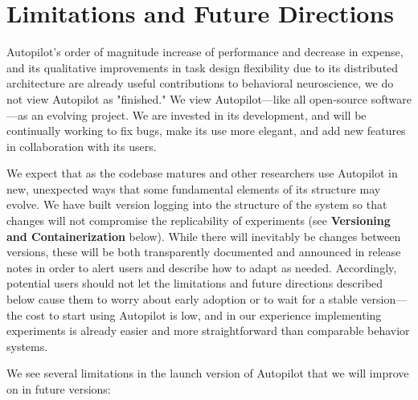 \documentclass[nohyper, justified, notitlepage, marginals=raggedright,twoside=false,debug]{tufte-autopilot}
\begin{document}
\chapter{Limitations and Future Directions}
\label{sec:future}
\begin{fullwidth}

 Autopilot's order of magnitude increase of performance and decrease in expense, and its qualitative improvements in task design flexibility due to its distributed architecture are already useful contributions to behavioral neuroscience, we do not view Autopilot as "finished." We view Autopilot---like all open-source software---as an evolving project. We are invested in its development, and will be continually working to fix bugs, make its use more elegant, and add new features in collaboration with its users. 

We expect that as the codebase matures and other researchers use Autopilot in new, unexpected ways that some fundamental elements of its structure may evolve. We have built version logging into the structure of the system so that changes will not compromise the replicability of experiments (see \textbf{Versioning and Containerization} below). While there will inevitably be changes between versions, these will be both transparently documented and announced in release notes in order to alert users and describe how to adapt as needed. Accordingly, potential users should not let the limitations and future directions described below cause them to worry about early adoption or to wait for a stable version---the cost to start using Autopilot is low, and in our experience implementing experiments is already easier and more straightforward than comparable behavior systems. 

\vspace{12pt}

\noindent We see several limitations in the launch version of Autopilot that we will improve on in future versions:



\end{fullwidth}
\end{document}
